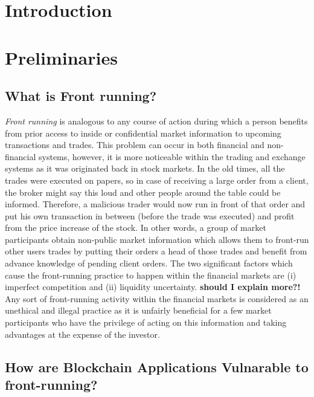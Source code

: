 
\section{Introduction}

\section{Preliminaries}

\subsection{What is Front running?} %
\label{sec:What is front-running?}

\emph{Front running} is analogous to any course of action during which a person benefits from prior access to inside or confidential market information to upcoming transactions and trades. This problem can occur in both financial and non-financial systems, however, it is more noticeable within the trading and exchange systems as it was originated back in stock markets. In the old times, all the trades were executed on papers, so in case of receiving a large order from a client, the broker might say this loud and other people around the table could be informed. Therefore, a malicious trader would now run in front of that order and put his own transaction in between (before the trade was executed) and profit from the price increase of the stock. In other words, a group of market participants obtain non-public market information which allows them to front-run other users trades by putting their orders a head of those trades and benefit from advance knowledge of pending client orders. The two significant factors which cause the front-running practice to happen within the financial markets are (i) imperfect competition and (ii) liquidity uncertainty. \textbf{should I explain more?!} Any sort of front-running activity within the financial markets is considered as an unethical and illegal practice as it is unfairly beneficial for a few market participants who have the privilege of acting on this information and taking advantages at the expense of the investor. 



\subsection{How are Blockchain Applications Vulnarable to front-running?}
\label{sec:Front Running on the Blockchains}

